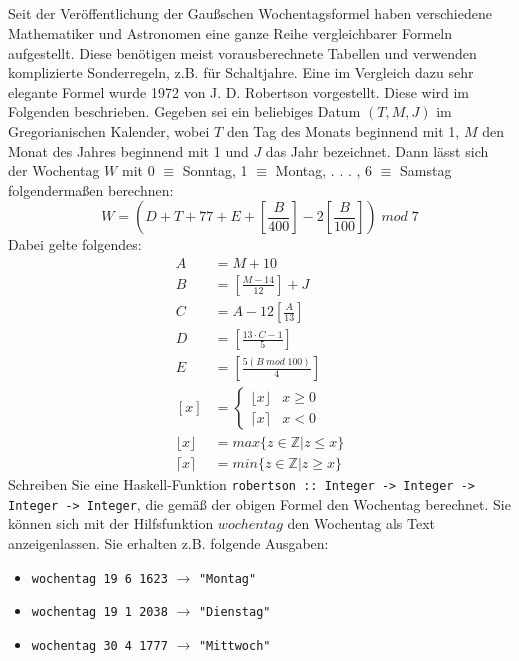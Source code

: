 \documentclass[
  10pt,                   %
  DIV12,
  german,                 %
  oneside,                %
  parskip=half,           %
  headings=normal,        %
  captions=tableheading,  %
]{scrartcl}
\begin{document}
\subsection{}
Seit der Veröffentlichung der Gaußschen Wochentagsformel haben verschiedene Mathematiker und Astronomen eine ganze Reihe vergleichbarer Formeln aufgestellt. Diese benötigen meist vorausberechnete Tabellen und verwenden komplizierte Sonderregeln, z.B. für Schaltjahre. Eine im Vergleich dazu sehr elegante Formel wurde 1972 von J. D. Robertson vorgestellt. Diese wird im Folgenden beschrieben. Gegeben sei ein beliebiges Datum $(T, M, J)$ im Gregorianischen Kalender, wobei $T$ den Tag des Monats beginnend mit 1, $M$ den Monat des Jahres beginnend mit 1 und $J$ das Jahr bezeichnet. Dann lässt sich der Wochentag $W$ mit 0 $\equiv$ Sonntag, 1 $\equiv$ Montag, . . . , 6 $\equiv$ Samstag folgendermaßen berechnen:
\begin{displaymath}
W = \left(D  + T + 77 + E + \left[\frac{B}{400}\right] - 2 \left[\frac{B}{100}\right]\right) \;mod\;7
\end{displaymath}
Dabei gelte folgendes:
\begin{align*}
A &= M + 10\\
B &= \left[\frac{M - 14}{12}\right] + J\\
C &= A - 12 \left[\frac{A}{13}\right]\\
D &= \left[\frac{13 \cdot C - 1}{5}\right]\\
E &= \left[\frac{5(B \; mod \; 100)}{4}\right]\\
[x] &= \begin{cases}\lfloor x \rfloor& x \geq 0 \\ \lceil x \rceil & x < 0 \end{cases} \\
\lfloor x \rfloor &= max\{ z \in \mathbb{Z} | z \leq x\}\\
\lceil x \rceil &= min\{ z \in \mathbb{Z} | z \geq x\}
\end{align*}
Schreiben Sie eine Haskell-Funktion \lstinline|robertson :: Integer -> Integer -> Integer -> Integer|, die gemäß der obigen Formel den Wochentag berechnet. Sie können sich mit der Hilfsfunktion $wochentag$ den Wochentag als Text anzeigenlassen. Sie erhalten z.B. folgende Ausgaben:
\begin{itemize}
\item \lstinline|wochentag 19 6 1623| $\to$ \lstinline|"Montag"|
\item \lstinline|wochentag 19 1 2038| $\to$ \lstinline|"Dienstag"|
\item \lstinline|wochentag 30 4 1777| $\to$ \lstinline|"Mittwoch"|
\end{itemize}
\end{document}
